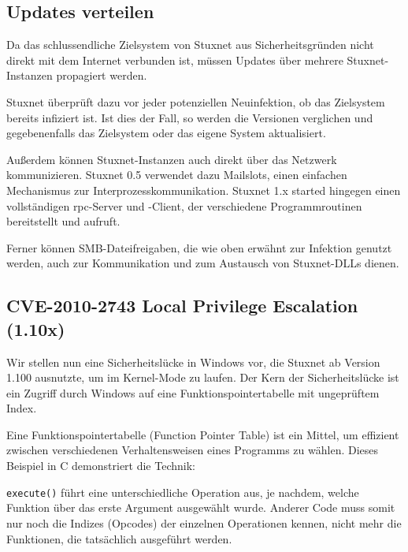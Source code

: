 \documentclass[a4paper]{article}
\begin{document}
\subsection{Updates verteilen}

Da das schlussendliche Zielsystem von Stuxnet aus Sicherheitsgründen nicht direkt mit dem Internet verbunden ist,
müssen Updates über mehrere Stuxnet-Instanzen propagiert werden.

Stuxnet überprüft dazu vor jeder potenziellen Neuinfektion, ob das Zielsystem bereits infiziert ist.
Ist dies der Fall, so werden die Versionen verglichen und gegebenenfalls das Zielsystem oder das eigene System aktualisiert.

Außerdem können Stuxnet-Instanzen auch direkt über das Netzwerk kommunizieren.
Stuxnet 0.5 verwendet dazu Mailslots, einen einfachen Mechanismus zur Interprozesskommunikation.
Stuxnet 1.x started hingegen einen vollständigen \gls{rpc}-Server und -Client, %
der verschiedene Programmroutinen bereitstellt und aufruft.

Ferner können SMB-Dateifreigaben, die wie oben erwähnt zur Infektion genutzt werden,
auch zur Kommunikation und zum Austausch von Stuxnet-DLLs dienen.

\subsection{CVE-2010-2743 Local Privilege Escalation (1.10x)}

Wir stellen nun eine Sicherheitslücke in Windows vor, die Stuxnet ab Version 1.100 ausnutzte, um im Kernel-Mode zu laufen.
Der Kern der Sicherheitslücke ist ein Zugriff durch Windows auf eine Funktionspointertabelle mit ungeprüftem Index.

Eine Funktionspointertabelle (Function Pointer Table) ist ein Mittel,
um effizient zwischen verschiedenen Verhaltensweisen eines Programms zu wählen.
Dieses Beispiel in C demonstriert die Technik:

\begin{figure}[H]
  
\end{figure}

\texttt{execute()} führt eine unterschiedliche Operation aus, je nachdem, welche Funktion über das erste Argument ausgewählt wurde.
Anderer Code muss somit nur noch die Indizes (Opcodes) der einzelnen Operationen kennen, nicht mehr die Funktionen, die tatsächlich ausgeführt werden.
\end{document}
